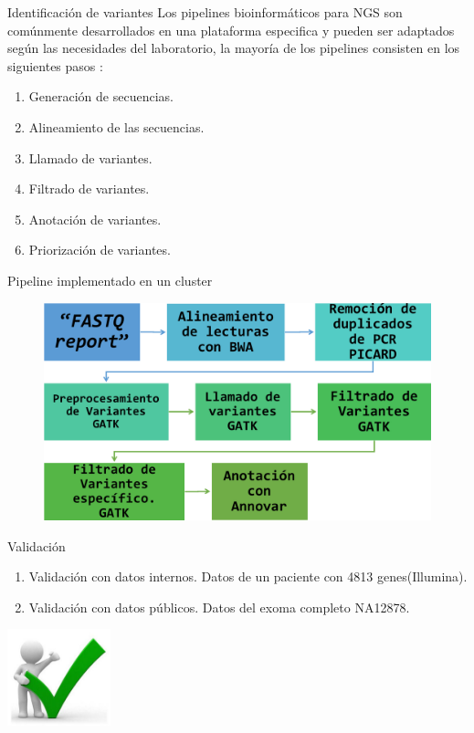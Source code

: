 \documentclass[xcolor=dvipsnames]{beamer}
\begin{document}
\begin{frame}{Identificación de variantes}
	\justifying 
	Los pipelines bioinformáticos para NGS son comúnmente desarrollados en una plataforma especifica y pueden ser adaptados según las necesidades del laboratorio, la mayoría de los pipelines consisten en los siguientes pasos \cite{Roy2018}:
	\justifying 
	\begin{enumerate}[1.]
		\justifying
		\item Generación de secuencias.
		\item Alineamiento de las secuencias.
		\item Llamado de variantes.
		\item Filtrado de variantes.
		\item Anotación de variantes.
		\item Priorización de variantes. 
	\end{enumerate}
\end{frame}

\begin{frame}{Pipeline implementado en un cluster}
	
	\begin{figure}
		\includegraphics[width=1\textwidth]{pipeline1}
		
	\end{figure}
	
\end{frame}


\begin{frame}{Validación}
	
	\begin{enumerate}[1.]
		\item Validación con datos internos. Datos de un paciente con 4813 genes(Illumina).
		\item Validación con datos públicos. Datos del exoma completo NA12878.
	\end{enumerate}
	\centering
	\includegraphics[width=30mm]{validacion.png}
	
\end{frame}
\end{document}
